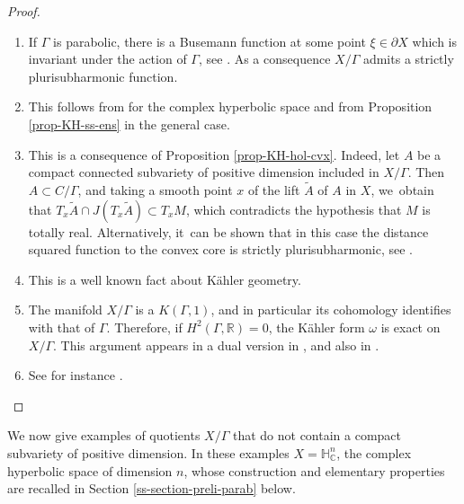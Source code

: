 \documentclass[JEP,XML,SOM,Unicode,NoEqCountersInSection,published]{cedram}
\newenvironment{enumeratea}
{\bgroup\def\theenumi{\alph{enumi}}
\begin{enumerate}}
{\end{enumerate}\egroup}
\theoremstyle{definition}
\newcommand{\C}{\mathbb{C}}
\newcommand{\R}{\mathbb{R}}
\newcommand{\HNC}{\mathbb{H}^{n}_{\C}}
\def\C{\mathbb{C}}
\newcommand{\HNC}{\mathbb{H}^{n}_{\C}}
\begin{document}
\skpt
\begin{proof}
\begin{enumeratea}
\item If $\Gamma$ is parabolic, there is a Busemann function at some point $\xi\in \partial X$ which is invariant under the action of $\Gamma$, see \cite[Prop.\,7.8]{eberleinVisibilityManifolds1973}. As a consequence $X/\Gamma$ admits a strictly plurisubharmonic function.
\item This follows from \cite{deyNoteComplexhyperbolicKleinian2020} for the complex hyperbolic space and from Proposition \ref{prop-KH-ss-ens} in the general case.
\item This is a consequence of Proposition \ref{prop-KH-hol-cvx}. Indeed, let $A$ be a compact connected subvariety of positive dimension included in $X/\Gamma$. Then $A\subset C/\Gamma$, and taking a smooth point $x$ of the lift $\tilde{A}$ of $A$ in $X$, we~obtain that $T_x\tilde{A}\cap J(T_x\tilde{A}) \subset T_xM$, which contradicts the hypothesis that $M$ is totally real. Alternatively, it~can be shown that in this case the distance squared function to the convex core is strictly plurisubharmonic, see \cite{chenDiscreteGroupsHolomorphic2013}.
\item This is a well known fact about Kähler geometry.
\item The manifold $X/\Gamma$ is a $K(\Gamma,1)$, and in particular its cohomology identifies with that of $\Gamma$. Therefore, if $H^{2}(\Gamma,\R)=0$, the Kähler form $\omega$ is exact on $X/\Gamma$. This argument appears in a dual version in \cite[Lem.\,4.2]{miebachSchottkyGroupActions2018}, and also in \cite[p.\,27]{kapovichSurveyComplexHyperbolic2022}.
\item See for instance \cite[Proof of Th.\,1.5]{connellNaturalFlowCritical2023}.\qedhere
\end{enumeratea}
\end{proof}
We now give examples of quotients $X/\Gamma$ that do not contain a compact subvariety of positive dimension. In these examples $X=\HNC$, the complex hyperbolic space of dimension $n$, whose construction and elementary properties are recalled in Section \ref{ss-section-preli-parab} below.
\end{document}
